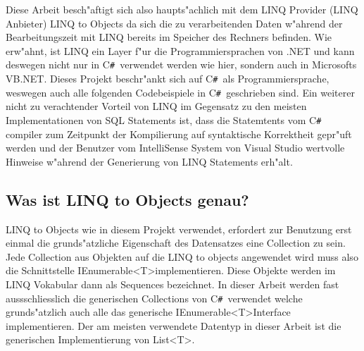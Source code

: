 \documentclass[pagesize, paper=a4, fontsize=12pt,titlepage=true, headings=small, headnosepline, abstractoff, liststotoc, nochapterprefix, plainheadsepline]{scrreprt}
\newcommand{\CSS}{C\texttt{\# }}
\newcommand{\GT}{\textless T\textgreater}
\newcommand{\GTS}{\textless T\textgreater\space}
\begin{document}
Diese Arbeit besch"aftigt sich also haupts"achlich mit dem LINQ Provider (LINQ Anbieter) LINQ to Objects da sich die zu verarbeitenden Daten w"ahrend der Bearbeitungszeit mit LINQ bereits im Speicher des Rechners befinden. Wie erw"ahnt, ist LINQ ein Layer f"ur die Programmiersprachen von .NET und kann deswegen nicht nur in \CSS verwendet werden wie hier, sondern auch in Microsofts VB.NET. Dieses Projekt beschr"ankt sich auf \CSS als Programmiersprache, weswegen auch alle folgenden Codebeispiele in \CSS geschrieben sind. Ein weiterer nicht zu verachtender Vorteil von LINQ im Gegensatz zu den meisten Implementationen von SQL Statements ist, dass die Statemtents vom \CSS compiler zum Zeitpunkt der Kompilierung auf syntaktische Korrektheit gepr"uft werden und der Benutzer vom IntelliSense System von Visual Studio wertvolle Hinweise w"ahrend der Generierung von LINQ Statements erh"alt.
		\subsection {Was ist LINQ to Objects genau? }
		LINQ to Objects wie in diesem Projekt verwendet, erfordert zur Benutzung erst einmal die grunds"atzliche Eigenschaft des Datensatzes eine Collection zu sein. Jede Collection aus Objekten auf die LINQ to objects angewendet wird muss also die Schnittstelle IEnumerable\GTS implementieren. Diese Objekte werden im LINQ Vokabular dann als Sequences bezeichnet. In dieser Arbeit werden fast aussschliesslich die generischen Collections von \CSS verwendet welche grunds"atzlich auch alle das generische IEnumerable\GTS Interface implementieren. Der am meisten verwendete Datentyp in dieser Arbeit ist die generischen Implementierung von List\GT.
\end{document}
